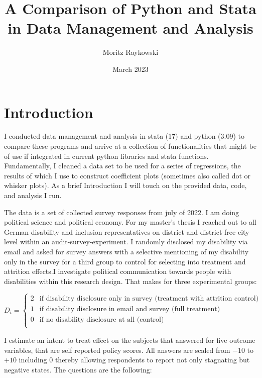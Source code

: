 \documentclass[10pt]{article}
\title{A Comparison of Python and Stata in Data Management and Analysis
}
\author{Moritz Raykowski}
\date{March 2023}
\begin{document}
\maketitle
\section{Introduction}
I conducted data management and analysis in stata (17) and python (3.09) to compare these programs 
and arrive at a collection of functionalities that might be of use if integrated in current python 
libraries and stata functions.
Fundamentally, I cleaned a data set to be used for a series of regressions, the results of which 
I use to construct coefficient plots (sometimes also called dot or whisker plots).
As a brief Introduction I will touch on the provided data, code, and analysis I run.

The data is a set of collected survey responses from july of 2022. I am doing political science and political economy.
For my master's thesis I reached out to all German disability and inclusion representatives on district and district-free city 
level within an audit-survey-experiment. I randomly disclosed my disability via email and asked for survey answers 
with a selective mentioning of my disability only in the survey for a third group to control for selecting into 
treatment and attrition effects.I investigate political communication towards people with disabilities 
within this research design. That makes for three experimental groups:

\begin{equation}
    D_{i} = \begin{cases}
          2 & \text{if disability disclosure only in survey (treatment with attrition control)}\\
          1 & \text{if disability disclosure in email and survey (full treatment)}\\
          0 & \text{if no disability disclosure at all (control)}\\
        \end{cases} 
    \end{equation}

I estimate an intent to treat effect on the subjects that answered for five outcome variables, that are 
self reported policy scores. 
All answers are scaled from $-10$ to $+10$ including $0$ thereby allowing respondents to report 
not only stagnating but negative states. The questions are the following:
\end{document}
